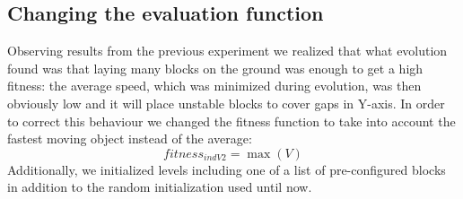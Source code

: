 \documentclass[a4paper,twoside]{article}
\begin{document}
\subsection{Changing the evaluation function}\label{E6}

Observing results from the previous experiment we realized that what
evolution found was that laying many blocks on the ground was enough
to get a high fitness: the average speed, which was minimized during
evolution, was then obviously low and it will 
place unstable blocks to cover gaps in Y-axis. In
order to correct this behaviour we changed the 
fitness function to take into account the fastest moving object
instead of the average:
$$fitness_{indV2} = \max{(V)}$$
Additionally, we initialized levels including one of a list of pre-configured
blocks in addition to the random initialization used until
now.
\end{document}
